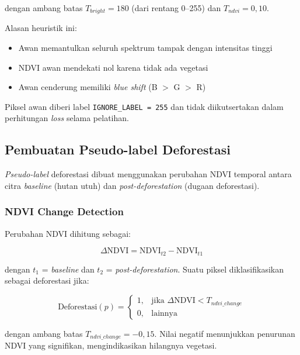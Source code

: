 \documentclass[12pt,a4paper]{article}
\begin{document}
dengan ambang batas $T_{bright} = 180$ (dari rentang 0--255) dan $T_{ndvi} = 0,10$.

Alasan heuristik ini:

\begin{itemize}[nosep]
    \item Awan memantulkan seluruh spektrum tampak dengan intensitas tinggi
    \item NDVI awan mendekati nol karena tidak ada vegetasi
    \item Awan cenderung memiliki \textit{blue shift} (B $>$ G $>$ R)
\end{itemize}

Piksel awan diberi label \texttt{IGNORE\_LABEL = 255} dan tidak diikutsertakan 
dalam perhitungan \textit{loss} selama pelatihan.

\subsection{Pembuatan Pseudo-label Deforestasi}

\label{sec:label}

\textit{Pseudo-label} deforestasi dibuat menggunakan perubahan NDVI temporal 
antara citra \textit{baseline} (hutan utuh) dan \textit{post-deforestation} 
(dugaan deforestasi).

\subsubsection{NDVI Change Detection}

Perubahan NDVI dihitung sebagai:

\begin{equation}
    \label{eq:ndvi_change}
    \Delta\text{NDVI} = \text{NDVI}_{t2} - \text{NDVI}_{t1}
\end{equation}

dengan $t_1$ = \textit{baseline} dan $t_2$ = \textit{post-deforestation}. 
Suatu piksel diklasifikasikan sebagai deforestasi jika:

\begin{equation}
    \label{eq:deforest}
    \text{Deforestasi}(p) =
    \begin{cases}
        1, & \text{jika } \Delta\text{NDVI} < T_{ndvi\_change} \\
        0, & \text{lainnya}
    \end{cases}
\end{equation}

dengan ambang batas $T_{ndvi\_change} = -0,15$. Nilai negatif menunjukkan 
penurunan NDVI yang signifikan, mengindikasikan hilangnya vegetasi.
\end{document}
